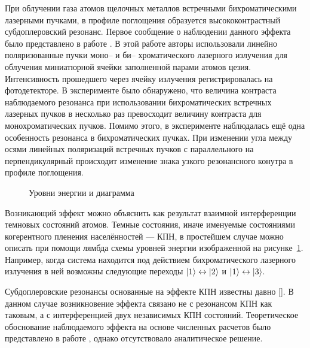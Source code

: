 
{\actuality}При облучении газа атомов щелочных металлов встречными бихроматическими лазерными пучками, в профиле поглощения образуется высококонтрастный субдоплеровский резонанс.
Первое сообщение о наблюдении данного эффекта было представлено в работе \autocite{hafiz2016}.
В этой работе авторы использовали линейно поляризованные пучки моно-- и би-- хроматического лазерного излучения для облучения миниатюрной ячейки заполненной парами атомов цезия.
Интенсивность прошедшего через ячейку излучения регистрировалась на фотодетекторе.
В эксперименте было обнаружено, что величина контраста наблюдаемого резонанса при использовании бихроматических встречных лазерных пучков в несколько раз превосходит величину контраста для монохроматических пучков. 
Помимо этого, в эксперименте наблюдалась ещё одна особенность резонанса в бихроматических пучках.
При изменении угла между осями линейных поляризаций встречных пучков с параллельного на перпендикулярный происходит изменение знака узкого резонансного конутра в профиле поглощения.

\begin{figure}[ht]
    \legend{}
    \caption[Этот текст попадает в названия рисунков в списке рисунков]{Уровни энергии и диаграмма}\label{fig:lambda}
\end{figure}
Возникающий эффект можно объяснить как результат взаимной интерференции темновых состояний атомов.
Темные состояния, иначе именуемые состояниями когерентного пленения населённостей --- КПН, в простейшем случае можно описать при помощи лямбда схемы уровней энергии изображенной на рисунке~\cref{fig:lambda}.
Например, когда система находится под действием бихроматического лазерного излучения в ней возможны следующие переходы $\lvert {1} \rangle\leftrightarrow\lvert {2} \rangle$ и $\lvert {1} \rangle\leftrightarrow\lvert {3} \rangle$. 


Субдоплеровские резонансы основанные на эффекте КПН известны давно []. 
В данном случае возникновение эффекта связано не с резонансом КПН как таковым, а с интерференцией двух независимых КПН состояний.
Теоретическое обоснование наблюдаемого эффекта на основе численных расчетов было представлено в работе \autocite{hafiz2017}, однако отсутствовало аналитическое решение.

